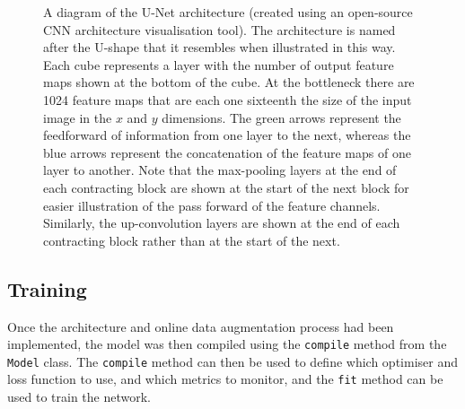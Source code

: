 \begin{figure}[!t]
    \centering
    
    \caption[A diagram of the U-Net architecture (created using an open-source CNN architecture visualisation tool). The architecture is named after the U-shape that it resembles when illustrated in this way. Each cube represents a layer with the number of output feature maps shown at the bottom of the cube. At the bottleneck there are 1024 feature maps that are each one sixteenth the size of the input image in the $x$ and $y$ dimensions. The green arrows represent the feedforward of information from one layer to the next, whereas the blue arrows represent the concatenation of the feature maps of one layer to another. Note that the max-pooling layers at the end of each contracting block are shown at the start of the next block for easier illustration of the pass forward of the feature channels. Similarly, the up-convolution layers are shown at the end of each contracting block rather than at the start of the next.]{A diagram of the U-Net architecture (created using an open-source CNN architecture visualisation tool\footnotemark). The architecture is named after the U-shape that it resembles when illustrated in this way. Each cube represents a layer with the number of output feature maps shown at the bottom of the cube. At the bottleneck there are 1024 feature maps that are each one sixteenth the size of the input image in the $x$ and $y$ dimensions. The green arrows represent the feedforward of information from one layer to the next, whereas the blue arrows represent the concatenation of the feature maps of one layer to another. Note that the max-pooling layers at the end of each contracting block are shown at the start of the next block for easier illustration of the pass forward of the feature channels. Similarly, the up-convolution layers are shown at the end of each contracting block rather than at the start of the next.}
    \label{fig:unetushape}
\end{figure}

\subsection{Training}


Once the architecture and online data augmentation process had been implemented, the model was then compiled using the \texttt{compile} method from the \texttt{Model} class. The \texttt{compile} method can then be used to define which optimiser and loss function to use, and which metrics to monitor, and the \texttt{fit} method can be used to train the network.


